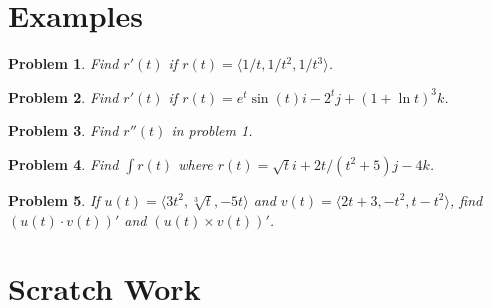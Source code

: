 \documentclass[11pt]{article}
\newtheorem{problem}{Problem}
\begin{document}
\section{Examples}

\begin{problem}
  Find $r'(t)$ if $r(t) = \langle 1/t, 1/t^2, 1/t^3 \rangle$.
\end{problem}

\vspace{6cm}

\begin{problem}
   Find $r'(t)$ if $r(t) = e^t\sin(t)i - 2^tj + (1+\ln{t})^3k$.
\end{problem}

\vspace{7 cm}


\begin{problem}
Find $r''(t)$ in problem 1.
\end{problem}


\vspace{8cm}

\begin{problem}
Find $\int r(t) $ where $r(t) = \sqrt{t}i + 2t/(t^2+5)j - 4k$.
\end{problem}

\vspace{12cm}



\begin{problem}
    If $u(t) = \langle 3t^2, \sqrt[3]{t}, -5t \rangle$ and $v(t) = \langle 2t+3, -t^2, t-t^2 \rangle$, find $(u(t)\cdot v(t))'$ and $(u(t) \times v(t))'$.
\end{problem}
\newpage

\section{Scratch Work}
\end{document}
